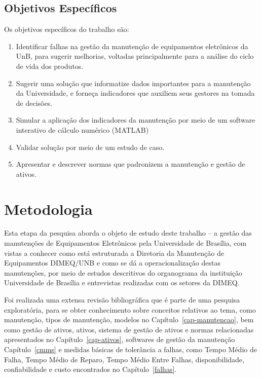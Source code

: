 \section{Objetivos Específicos}

Os objetivos específicos do trabalho são:

\begin{enumerate}
	\item Identificar falhas na gestão da manutenção de equipamentos eletrônicos da UnB, para sugerir melhorias, voltadas principalmente para a análise do ciclo de vida dos produtos.
	\item Sugerir uma solução que informatize dados importantes para a manutenção da Universidade, e forneça indicadores que auxiliem seus gestores na tomada de decisões.
	\item Simular a aplicação dos indicadores da manutenção por meio de um software interativo de cálculo numérico (MATLAB) 
	\item Validar solução por meio de um estudo de caso.
	\item Apresentar e descrever normas que padronizem a manutenção e gestão de ativos.
\end{enumerate}


\chapter{Metodologia}

Esta etapa da pesquisa aborda o objeto de estudo deste trabalho – a gestão das manutenções de Equipamentos Eletrônicos pela Universidade de Brasília, com vistas a conhecer como está estruturada a Diretoria da Manutenção de Equipamentos DIMEQ/UNB e como se dá a operacionalização destas manutenções, por meio de estudos descritivos do organograma da instituição Universidade de Brasília e entrevistas realizadas com os setores da DIMEQ.

Foi realizada uma extensa revisão bibliográfica que é parte de uma pesquisa exploratória, para se obter conhecimento sobre conceitos relativos ao tema, como manutenção, tipos de manutenção, modelos no Capítulo~\ref{cap-manutencao}, bem como gestão de ativos, ativos, sistema de gestão de ativos e normas relacionadas apresentados no Capítulo~\ref{cap-ativos}, softwares de gestão da manutenção Capítulo~\ref{cmms} e medidas básicas de tolerância a falhas, como  Tempo Médio de Falha, Tempo Médio de Reparo, Tempo Médio Entre Falhas, disponibilidade, confiabilidade e custo encontrados no Capítulo~\ref{falhas}.

